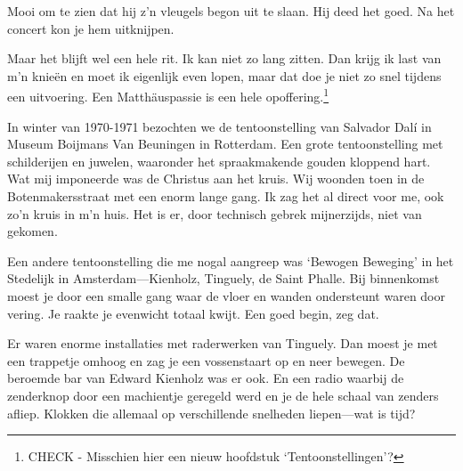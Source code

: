 \documentclass[10pt,twoside, openright]{memoir}
\begin{document}
Mooi om te zien dat hij z’n vleugels begon uit te slaan. Hij deed het goed. Na het concert kon je hem uitknijpen.  

Maar het blijft wel een hele rit. Ik kan niet zo lang zitten. Dan krijg ik last van m’n knieën en moet ik eigenlijk even lopen, maar dat doe je niet zo snel tijdens een uitvoering. Een Matthäuspassie is een hele opoffering.\footnote{CHECK - Misschien hier een nieuw hoofdstuk `Tentoonstellingen'?}

In winter van 1970-1971 bezochten we de tentoonstelling van Salvador Dalí in Museum Boijmans Van Beuningen in Rotterdam. Een grote tentoonstelling met schilderijen en juwelen, waaronder het spraakmakende gouden kloppend hart. Wat mij imponeerde was de Christus aan het kruis. Wij woonden toen in de Botenmakersstraat met een enorm lange gang. Ik zag het al direct voor me, ook zo’n kruis in m’n huis. Het is er, door technisch gebrek mijnerzijds, niet van gekomen.

Een andere tentoonstelling die me nogal aangreep was `Bewogen Beweging' in het Stedelijk in Amsterdam---Kienholz, Tinguely, de Saint Phalle. Bij binnenkomst moest je door een smalle gang waar de vloer en wanden ondersteunt waren door vering. Je raakte je evenwicht totaal kwijt. Een goed begin, zeg dat.

Er waren enorme installaties met raderwerken van Tinguely. Dan moest je met een trappetje omhoog en zag je een vossenstaart op en neer bewegen. De beroemde bar van Edward Kienholz was er ook. En een radio waarbij de zenderknop door een machientje geregeld werd en je de hele schaal van zenders afliep. Klokken die allemaal op verschillende snelheden liepen---wat is tijd? 
\end{document}
